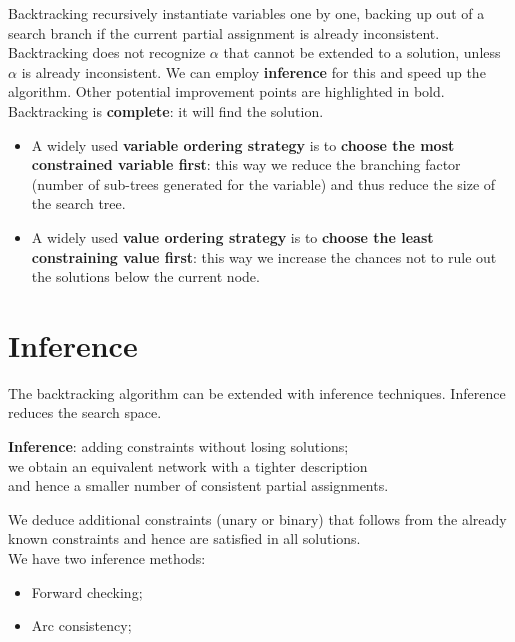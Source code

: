 \documentclass{article}
\begin{document}
Backtracking recursively instantiate variables one by one, backing up out of a search branch if the current partial assignment is already inconsistent. Backtracking does not recognize $\alpha$ that cannot be extended to a solution, unless $\alpha$ is already inconsistent. We can employ \textbf{inference} for this and speed up the algorithm. Other potential improvement points are highlighted in bold.\\

Backtracking is \textbf{complete}: it will find the solution.

\newpage

\begin{itemize}
    \item A widely used \textbf{variable ordering strategy} is to \textbf{choose the most constrained variable first}: this way we reduce the branching factor (number of sub-trees generated for the variable) and thus reduce the size of the search tree.
    \item A widely used \textbf{value ordering strategy} is to \textbf{choose the least constraining value first}: this way we increase the chances not to rule out the solutions below the current node. 
\end{itemize}

\newpage

\section{Inference}

The backtracking algorithm can be extended with inference techniques. Inference reduces the search space. 

\begin{center}
    \textbf{Inference}: adding constraints without losing solutions; \\ we obtain an equivalent network with a tighter description \\ and hence a smaller number of consistent partial assignments.
\end{center}

We deduce additional constraints (unary or binary) that follows from the already known constraints and hence are satisfied in all solutions. \\

We have two inference methods:
\begin{itemize}
    \item Forward checking;
    \item Arc consistency;
\end{itemize}
\end{document}
